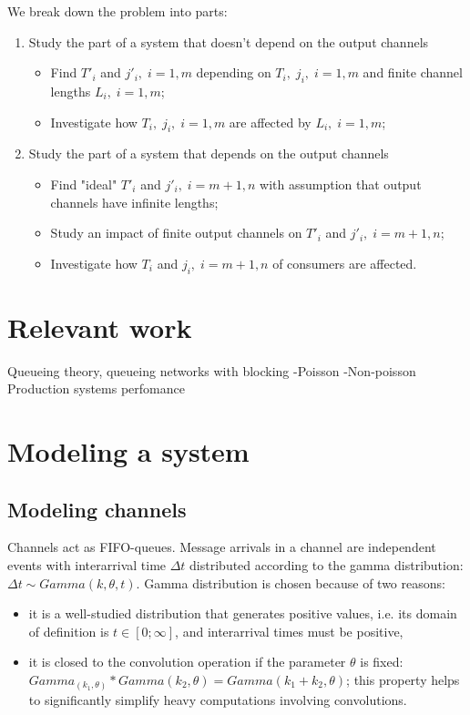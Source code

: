 We break down the problem into parts:
  \begin{enumerate}
  \item Study the part of a system that doesn't depend on the output channels
    \begin{itemize}
    \item Find $T'_{i}$ and $j'_{i}, \; i=1,m$ depending on $T_{i}, \; j_{i}, \; i=1,m$ and finite channel lengths $L_{i}, \; i=1,m$;
    \item Investigate how $T_{i}, \; j_{i}, \; i=1,m$ are affected by $L_{i}, \; i=1,m$;
  \end{itemize}

  \item Study the part of a system that depends on the output channels
    \begin{itemize}
    \item Find "ideal" $T'_{i}$ and $j'_{i}, \; i=m+1,n$ with assumption that output channels have infinite lengths;
    \item Study an impact of finite output channels on $T'_{i}$ and $j'_{i}, \; i=m+1,n$;
    \item Investigate how $T_{i}$ and $j_{i}, \; i=m+1,n$ of consumers are affected.
    \end{itemize}
  \end{enumerate}


\section{Relevant work}
Queueing theory, queueing networks with blocking
-Poisson
-Non-poisson
Production systems perfomance


\section{Modeling a system}

  \subsection{Modeling channels}
Channels act as FIFO-queues. Message arrivals in a channel are independent events with interarrival time $\Delta t$ distributed according to the gamma distribution: $\Delta t \sim Gamma (k, \theta, t)$. Gamma distribution is chosen because of two reasons:
    \begin{itemize}
    \item it is a well-studied distribution that generates positive values, i.e. its domain of definition is $t \in [0;\infty]$, and interarrival times must be positive,
    \item it is closed to the convolution operation if the parameter $\theta$ is fixed: $Gamma_(k_{1}, \theta) * Gamma (k_{2}, \theta) = Gamma (k_{1} + k_{2}, \theta)$; this property helps to significantly simplify heavy computations involving convolutions.
    \end{itemize}

